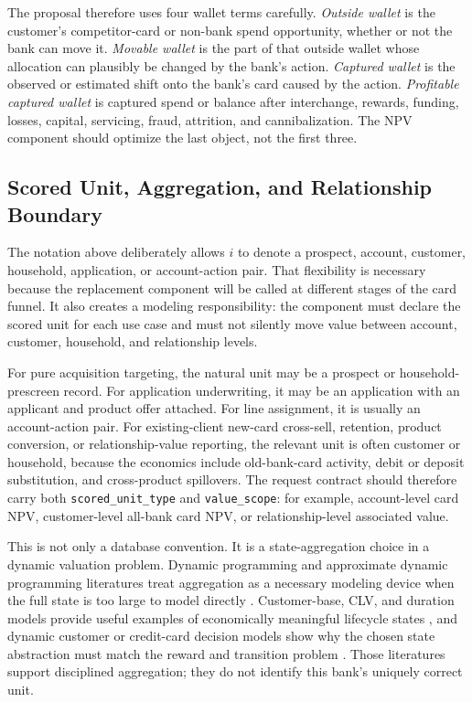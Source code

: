 \documentclass[11pt]{article}
\newcommand{\1}{\mathbf{1}}
\newcommand{\code}[1]{\nolinkurl{#1}}
\begin{document}
The proposal therefore uses four wallet terms carefully. \emph{Outside wallet}
is the customer's competitor-card or non-bank spend opportunity, whether or
not the bank can move it. \emph{Movable wallet} is the part of that outside
wallet whose allocation can plausibly be changed by the bank's action.
\emph{Captured wallet} is the observed or estimated shift onto the bank's card
caused by the action. \emph{Profitable captured wallet} is captured spend or
balance after interchange, rewards, funding, losses, capital, servicing, fraud,
attrition, and cannibalization. The NPV component should optimize the last
object, not the first three.

\subsection{Scored Unit, Aggregation, and Relationship Boundary}
\label{subsec:scored-unit-aggregation}

The notation above deliberately allows $i$ to denote a prospect, account,
customer, household, application, or account-action pair. That flexibility is
necessary because the replacement component will be called at different stages
of the card funnel. It also creates a modeling responsibility: the component
must declare the scored unit for each use case and must not silently move value
between account, customer, household, and relationship levels.

For pure acquisition targeting, the natural unit may be a prospect or
household-prescreen record. For application underwriting, it may be an
application with an applicant and product offer attached. For line assignment,
it is usually an account-action pair. For existing-client new-card cross-sell,
retention, product conversion, or relationship-value reporting, the relevant
unit is often customer or household, because the economics include old-bank-card
activity, debit or deposit substitution, and cross-product spillovers. The
request contract should therefore carry both \code{scored_unit_type} and
\code{value_scope}: for example, account-level card NPV, customer-level all-bank
card NPV, or relationship-level associated value.

This is not only a database convention. It is a state-aggregation choice in a
dynamic valuation problem. Dynamic programming and approximate dynamic
programming literatures treat aggregation as a necessary modeling device when
the full state is too large to model directly \citep{bean1987aggregation,
puterman1994mdp}. Customer-base, CLV, and duration models provide useful
examples of economically meaningful lifecycle states
\citep{schmittlein1987counting,fader2005bgnbd,bolton1998duration}, and dynamic
customer or credit-card decision models show why the chosen state abstraction
must match the reward and transition problem \citep{lewis2005relationshippricing,
thomas2011creditcardmdp}. Those literatures support disciplined aggregation;
they do not identify this bank's uniquely correct unit.
\end{document}
